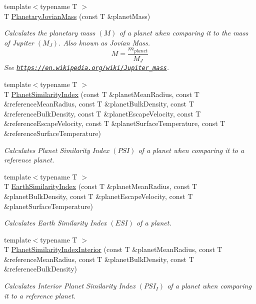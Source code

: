 \begin{DoxyCompactItemize}
{\footnotesize template$<$typename T $>$ }\\T \mbox{\hyperlink{group___e_g_x_phys-_planetary_mass_ga4663e9388a3bd1a20f94beb52021f293}{Planetary\+Jovian\+Mass}} (const T \&planet\+Mass)
\begin{DoxyCompactList}\small\item\em Calculates the planetary mass $(M)$ of a planet when comparing it to the mass of Jupiter $(M_J)$. Also known as Jovian Mass. \[M=\frac{m_{planet}}{M_J}\] See \href{https://en.wikipedia.org/wiki/Jupiter_mass}{\tt https\+://en.\+wikipedia.\+org/wiki/\+Jupiter\+\_\+mass}. \end{DoxyCompactList}\item 
{\footnotesize template$<$typename T $>$ }\\T \mbox{\hyperlink{group___e_g_x_phys-_planet_criteria_ga62e8b781c301df60bd04af3183a965eb}{Planet\+Similarity\+Index}} (const T \&planet\+Mean\+Radius, const T \&reference\+Mean\+Radius, const T \&planet\+Bulk\+Density, const T \&reference\+Bulk\+Density, const T \&planet\+Escape\+Velocity, const T \&reference\+Escape\+Velocity, const T \&planet\+Surface\+Temperature, const T \&reference\+Surface\+Temperature)
\begin{DoxyCompactList}\small\item\em Calculates Planet Similarity Index $(PSI)$ of a planet when comparing it to a reference planet. \end{DoxyCompactList}\item 
{\footnotesize template$<$typename T $>$ }\\T \mbox{\hyperlink{group___e_g_x_phys-_planet_criteria_ga4b86397b1c839c49ac599d49fda207d4}{Earth\+Similarity\+Index}} (const T \&planet\+Mean\+Radius, const T \&planet\+Bulk\+Density, const T \&planet\+Escape\+Velocity, const T \&planet\+Surface\+Temperature)
\begin{DoxyCompactList}\small\item\em Calculates Earth Similarity Index $(ESI)$ of a planet. \end{DoxyCompactList}\item 
{\footnotesize template$<$typename T $>$ }\\T \mbox{\hyperlink{group___e_g_x_phys-_planet_criteria_ga6dc06a1a8baf6e132abed51fcf410c7f}{Planet\+Similarity\+Index\+Interior}} (const T \&planet\+Mean\+Radius, const T \&reference\+Mean\+Radius, const T \&planet\+Bulk\+Density, const T \&reference\+Bulk\+Density)
\begin{DoxyCompactList}\small\item\em Calculates Interior Planet Similarity Index $(PSI_I)$ of a planet when comparing it to a reference planet. \end{DoxyCompactList}\item 

\end{DoxyCompactItemize}
